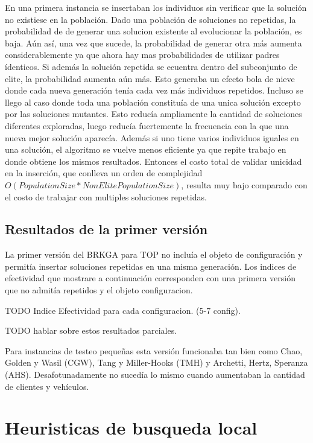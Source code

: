 En una primera instancia se insertaban los individuos sin verificar que la solución no existiese en la población. Dado una población de soluciones no repetidas, la probabilidad de de generar una solucion existente al evolucionar la población, es baja. Aún así, una vez que sucede, la probabilidad de generar otra más aumenta considerablemente ya que ahora hay mas probabilidades de utilizar padres ídenticos. Si además la solución repetida se ecuentra dentro del subconjunto de elite, la probabilidad aumenta aún más. Esto generaba un efecto bola de nieve donde cada nueva generación tenía cada vez más individuos repetidos. Incluso se llego al caso donde toda una población constituía de una unica solución excepto por las soluciones mutantes. Esto reducía ampliamente la cantidad de soluciones diferentes exploradas, luego reducía fuertemente la frecuencia con la que una nueva mejor solución aparecía. Además si uno tiene varios individuos iguales en una solución, el algoritmo se vuelve menos eficiente ya que repite trabajo en donde obtiene los mismos resultados. Entonces el costo total de validar unicidad en la inserción, que conlleva un orden de complejidad $O(PopulationSize * NonElitePopulationSize)$, resulta muy bajo comparado con el costo de trabajar con multiples soluciones repetidas.

\subsection{Resultados de la primer versión}

La primer versión del BRKGA para TOP no incluía el objeto de configuración y permitía insertar soluciones repetidas en una misma generación. Los indices de efectividad que mostrare a continuación corresponden con una primera versión que no admitía repetidos y el objeto configuracion.

\bigskip

TODO Indice Efectividad para cada configuracion. (5-7 config).

\bigskip

TODO hablar sobre estos resultados parciales.

Para instancias de testeo pequeñas esta versión funcionaba tan bien como Chao, Golden y Wasil (CGW), Tang y Miller-Hooks (TMH) y Archetti, Hertz, Speranza (AHS). Desafotunadamente no sucedía lo mismo cuando aumentaban la cantidad de clientes y vehículos.

\section{Heuristicas de busqueda local}

